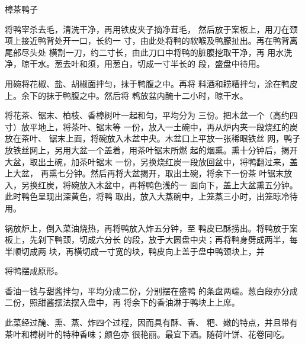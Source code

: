 \begin{recipe}{樟茶鸭子}

\ingredients


\cooking

\step 将鸭宰杀去毛，清洗干净，再用铁皮夹子摘净茸毛， 然后放于案板上，用刀在颈项上接近鸭背处开一口，长约一 寸，由此处将鸭的软喉及鸭朦扯出。再在鸭背离尾部尽头处 横割一刀，约二寸长，由此刀口中将鸭的脏腹挖取干净，再 用水洗净，晾干水。葱去叶和须，用葱白，切成一寸半长的 段，盛盘中待用。

\step 用碗将花椒、盐、胡椒面拌匀，抹于鸭腹之中。再将 料酒和耢糟拌匀，涂在鸭皮上。余下的抹于鸭腹之中。然后将 鹎放盆内醃十二小时，晾干水。

\step 将花茶、锯末、柏枝、香樟树叶一起和匀，平均分为 三份。把木盆一个（高约四寸）放平地上，将茶叶、锯末等 一份，放入一土碗中，再从炉内夹一段烧红的炭放在茶叶、 锯末上面，将碗放入木盆中央。木盆口上平放一张稀眼铁丝 网，鸭子放铁丝网上，另用大盆一个盖着，用茶叶锯末所燃 起的烟熏。熏十分钟后，揭开大盆，取出土碗，加茶叶锯末 一份，另换烧红炭一段放回盆中，将鸭翻过来，盖上大盆， 再熏七分钟。然后再将大盆揭开，取出土碗，将余下一份茶 叶锯末放入，另换红炭，将碗放入木盆中，再将鸭色浅的一 面向下，盖上大盆熏五分钟。此时鸭色呈现出深黄色，将鸭 取出，放入大蒸碗中，上笼蒸三小时，出笼晾冷待用。

\step 锅放炉上，倒入菜油烧热，再将鸭放入炸五分钟，至 鸭皮已酥捞出。将鸭放于案板上，先剁下鸭颈，切成六分长 的段，放于大圆盘中央；再将鸭身劈成两半，每半顺切成两 块，再横切成一寸宽的块，鸭皮向上盖于盘中鸭颈块上，并

将鸭摆成原形。

\step 香油一钱与甜酱拌匀，平均分成二份，分别摆在盛鸭 的条盘两端。葱白段亦分成二份，照甜酱摆法摆入盘中，再 将余下的香油淋于鸭块上上席。

\notes

此菜经过醃、熏、蒸、炸四个过程，因而具有酥、香、 粑、嫩的特点，并且带有茶叶和樟树叶的特种香味；颜色亦 很艳丽。最宜下酒。随荷叶饼、花卷同吃。

\end{recipe}

